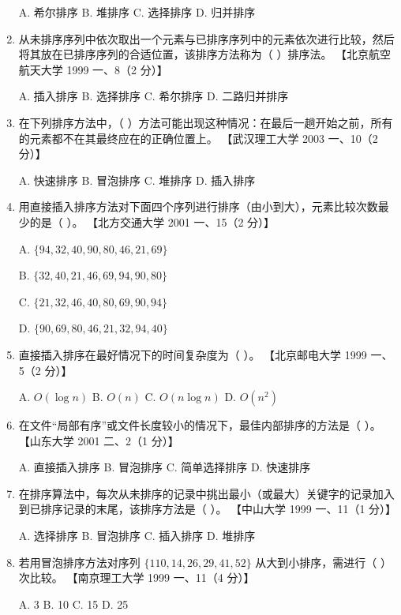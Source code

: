 \documentclass[lang=cn,newtx,10pt,scheme=chinese]{elegantbook}
\begin{document}
\begin{enumerate}
    A. 希尔排序 \quad B. 堆排序 \quad C. 选择排序 \quad D. 归并排序  

    \item 从未排序序列中依次取出一个元素与已排序序列中的元素依次进行比较，然后将其放在已排序序列的合适位置，该排序方法称为（ ）排序法。  
    【北京航空航天大学 1999 一、8（2 分）】  

    A. 插入排序 \quad B. 选择排序 \quad C. 希尔排序 \quad D. 二路归并排序  

    \item 在下列排序方法中，（ ）方法可能出现这种情况：在最后一趟开始之前，所有的元素都不在其最终应在的正确位置上。  
    【武汉理工大学 2003 一、10（2 分）】  

    A. 快速排序 \quad B. 冒泡排序 \quad C. 堆排序 \quad D. 插入排序  

    \item 用直接插入排序方法对下面四个序列进行排序（由小到大），元素比较次数最少的是（ ）。  
    【北方交通大学 2001 一、15（2 分）】  

    A. $\{94, 32, 40, 90, 80, 46, 21, 69\}$  

    B. $\{32, 40, 21, 46, 69, 94, 90, 80\}$  

    C. $\{21, 32, 46, 40, 80, 69, 90, 94\}$  

    D. $\{90, 69, 80, 46, 21, 32, 94, 40\}$  

    \item 直接插入排序在最好情况下的时间复杂度为（ ）。  
    【北京邮电大学 1999 一、5（2 分）】  

    A. $O(\log n)$ \quad B. $O(n)$ \quad C. $O(n \log n)$ \quad D. $O(n^2)$  

    \item 在文件“局部有序”或文件长度较小的情况下，最佳内部排序的方法是（ ）。  
    【山东大学 2001 二、2（1 分）】  

    A. 直接插入排序 \quad B. 冒泡排序 \quad C. 简单选择排序 \quad D. 快速排序 
    \item 在排序算法中，每次从未排序的记录中挑出最小（或最大）关键字的记录加入到已排序记录的末尾，该排序方法是（ ）。  
    【中山大学 1999 一、11（1 分）】

    A. 选择排序 \quad B. 冒泡排序 \quad C. 插入排序 \quad D. 堆排序  

    \item 若用冒泡排序方法对序列 $\{110, 14, 26, 29, 41, 52\}$ 从大到小排序，需进行（ ）次比较。  
    【南京理工大学 1999 一、11（4 分）】  

    A. 3 \quad B. 10 \quad C. 15 \quad D. 25  


\end{enumerate}
\end{document}
